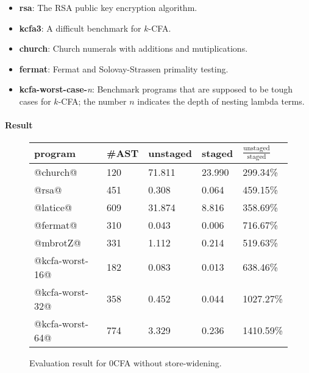 \begin{itemize}
  \item \textbf{rsa}: The RSA public key encryption algorithm.
  \item \textbf{kcfa3}: A difficult benchmark for $k$-CFA.
  \item \textbf{church}: Church numerals with additions and mutiplications.
  \item \textbf{fermat}: Fermat and Solovay-Strassen primality testing.
  \item \textbf{kcfa-worst-case-}\textit{n}: 
    Benchmark programs that are supposed to be tough cases for $k$-CFA; 
    the number $n$ indicates the depth of nesting lambda terms.
\end{itemize}

\paragraph{Result}

\begin{figure}[h]
\tiny
\begin{tabular}{@{}lllll@{}}
\toprule
    program          &\#AST & unstaged   & staged     & $\frac{\text{unstaged}}{\text{staged}}$ \\ \midrule
    @church@         & 120  & 71.811     & 23.990     & 299.34\%          \\
    @rsa@            & 451  & 0.308      & 0.064      & 459.15\%          \\
    @latice@         & 609  & 31.874     & 8.816      & 358.69\%          \\
    @fermat@         & 310  & 0.043      & 0.006      & 716.67\%          \\
    @mbrotZ@         & 331  & 1.112      & 0.214      & 519.63\%          \\
    @kcfa-worst-16@  & 182  & 0.083      & 0.013      & 638.46\%          \\
    @kcfa-worst-32@  & 358  & 0.452      & 0.044      & 1027.27\%         \\
    @kcfa-worst-64@  & 774  & 3.329      & 0.236      & 1410.59\%         \\
    \bottomrule
\end{tabular}
\caption{Evaluation result for 0CFA without store-widening.} \label{evaluation_result}
\end{figure}

